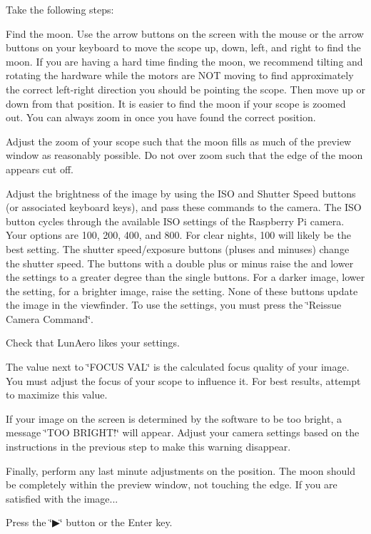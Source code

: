Take the following steps\+:


\begin{DoxyItemize}
\item Find the moon. Use the arrow buttons on the screen with the mouse or the arrow buttons on your keyboard to move the scope up, down, left, and right to find the moon. If you are having a hard time finding the moon, we recommend tilting and rotating the hardware while the motors are N\+OT moving to find approximately the correct left-\/right direction you should be pointing the scope. Then move up or down from that position. It is easier to find the moon if your scope is zoomed out. You can always zoom in once you have found the correct position.
\item Adjust the zoom of your scope such that the moon fills as much of the preview window as reasonably possible. Do not over zoom such that the edge of the moon appears cut off.
\item Adjust the brightness of the image by using the I\+SO and Shutter Speed buttons (or associated keyboard keys), and pass these commands to the camera. The I\+SO button cycles through the available I\+SO settings of the Raspberry Pi camera. Your options are 100, 200, 400, and 800. For clear nights, 100 will likely be the best setting. The shutter speed/exposure buttons (pluses and minuses) change the shutter speed. The buttons with a double plus or minus raise the and lower the settings to a greater degree than the single buttons. For a darker image, lower the setting, for a brighter image, raise the setting. None of these buttons update the image in the viewfinder. To use the settings, you must press the \char`\"{}\+Reissue Camera Command\char`\"{}.
\item Check that Lun\+Aero likes your settings.
\begin{DoxyItemize}
\item The value next to \char`\"{}\+F\+O\+C\+U\+S V\+A\+L\char`\"{} is the calculated focus quality of your image. You must adjust the focus of your scope to influence it. For best results, attempt to maximize this value.
\item If your image on the screen is determined by the software to be too bright, a message \char`\"{}\+T\+O\+O B\+R\+I\+G\+H\+T!\char`\"{} will appear. Adjust your camera settings based on the instructions in the previous step to make this warning disappear.
\end{DoxyItemize}
\item Finally, perform any last minute adjustments on the position. The moon should be completely within the preview window, not touching the edge. If you are satisfied with the image...
\item Press the \char`\"{}▶\char`\"{} button or the {\ttfamily Enter} key.
\end{DoxyItemize}

